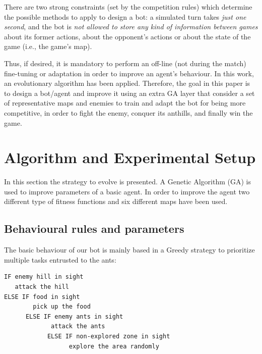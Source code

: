 \documentclass[runningheads]{llncs}
\begin{document}
There are two strong constraints (set by the competition rules) which determine the possible methods to apply to design a bot: a simulated turn takes \textit{just one second}, and the bot is \textit{not allowed to store any kind of information between games} about its former actions, about the opponent's actions or about the state of the game (i.e., the game's map). 

Thus, if desired, it is mandatory to  perform an off-line (not during the match) fine-tuning or adaptation in order to improve an agent's behaviour. In this work, an evolutionary algorithm has been applied. 
Therefore, the goal in this paper is to design a bot/agent and improve it using an extra GA layer that consider a set of representative maps and enemies to train and adapt the bot for being more competitive, in order to fight the enemy, conquer its anthills, and finally win the game. 




\section{Algorithm and Experimental Setup}

In this section the strategy to evolve is presented. A Genetic Algorithm (GA) is used to improve parameters of a basic agent.  In order to improve the agent two different type of fitness functions and six different maps have been used. 


\subsection{Behavioural rules and parameters}

The basic behaviour of our bot is mainly based in a Greedy strategy to prioritize multiple tasks entrusted to the ants:
\begin{verbatim}
IF enemy hill in sight
   attack the hill 
ELSE IF food in sight 
        pick up the food
	  ELSE IF enemy ants in sight
             attack the ants
		    ELSE IF non-explored zone in sight 
                  explore the area randomly
\end{verbatim}
\end{document}

